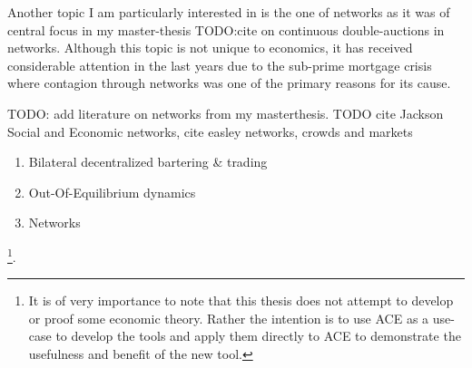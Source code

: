Another topic I am particularly interested in is the one of networks as it was of central focus in my master-thesis TODO:cite on continuous double-auctions in networks. Although this topic is not unique to economics, it has received considerable attention in the last years due to the sub-prime mortgage crisis where contagion through networks was one of the primary reasons for its cause.

TODO: add literature on networks from my masterthesis.
TODO cite Jackson Social and Economic networks, cite easley networks, crowds and markets


\begin{enumerate}
	\item Bilateral decentralized bartering \&  trading
	\item Out-Of-Equilibrium dynamics
	\item Networks
\end{enumerate}

 \footnote{It is of very importance to note that this thesis does not attempt to develop or proof some economic theory. Rather the intention is to use ACE as a use-case to develop the tools and apply them directly to ACE to demonstrate the usefulness and benefit of the new tool.}.